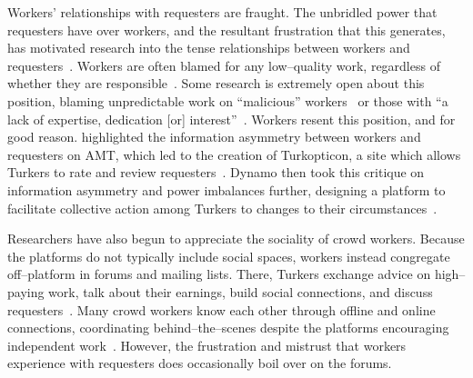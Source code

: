 \documentclass[trackingWork]{subfiles}
\begin{document}
Workers' relationships with requesters are fraught.
The unbridled power that requesters have over workers, and
the resultant frustration that this generates,
has motivated research into
the tense relationships between workers and requesters~\cite{fixingChaos,dynamo}.
Workers are often blamed for any low--quality work, regardless of whether they are responsible~\cite{martin2014being,takingAHITMcInnis}.
Some research is extremely open about this position, blaming unpredictable work on ``malicious'' workers~\cite{MaliciousCrowdworkersGadiraju} or those with ``a lack of expertise, dedication [or] interest''~\cite{Sheng:2008:GLI:1401890.1401965}.
Workers resent this position, and for good reason.
\citeauthor{turkopticon} highlighted the information asymmetry between workers and requesters on AMT,
which led to the creation of Turkopticon, a site which allows Turkers to rate and review requesters~\cite{turkopticon}.
Dynamo then took this critique on information asymmetry and power imbalances further, designing a platform to facilitate
collective action among Turkers to changes to their circumstances~\cite{dynamo}.


Researchers have also begun to appreciate the sociality of crowd workers.
Because the platforms do not typically include social spaces, workers instead congregate off--platform in forums and mailing lists.
There, Turkers exchange advice on high--paying work, talk about their earnings, build social connections, and discuss requesters~\cite{martin2014being}.
Many crowd workers know each other through offline and online connections, coordinating behind--the--scenes despite the platforms encouraging independent work~\cite{crowdcollab,yin2016communication}.
However, the frustration and mistrust that workers experience with requesters does occasionally boil over on the forums. 


\subsubsection{\pieceworkpers}

\begin{comment}
notes: what info do i assume the reader has seen already?
- Clark: pieceworkers work harder, more diligently, etc...
- Riis saw terrible conditions, documented and communicated it to the world
- Worker advocacy groups arose to speak out against piecework
\end{comment}
\end{document}
